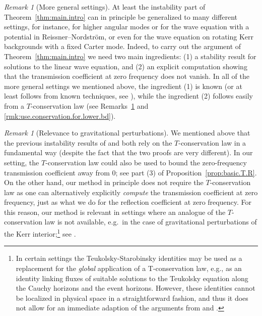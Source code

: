 \documentclass[10pt, reqno]{amsart}
\theoremstyle{definition}
\theoremstyle{remark}
\newtheorem{remark}[theorem]{Remark}
\numberwithin{equation}{section}
\newcommand{\0}{\emptyset}
\begin{document}
\begin{remark}[More general settings]\label{rmk:more.general}
At least the instability part of Theorem~\ref{thm:main.intro} can in principle be generalized to many different settings, for instance, for higher angular modes or for the wave equation with a potential in Reissner--Nordstr\"om, or even for the wave equation on rotating Kerr backgrounds with a fixed Carter mode. Indeed,  to carry out the argument of Theorem~\ref{thm:main.intro} we need two main ingredients: (1) a stability result for solutions to the linear wave equation, and (2) an explicit computation showing that the transmission coefficient at zero frequency does not vanish. In all of the more general settings we mentioned above, the ingredient (1) is known (or at least follows from known techniques, see \cite{Hintz,LS}), while the ingredient (2) follows easily from a $T$-conservation law (see Remarks~\ref{rmk:grav.pert} and \ref{rmk:use.conservation.for.lower.bd}).
\end{remark}

\begin{remark}[Relevance to gravitational perturbations]\label{rmk:grav.pert}
We mentioned above that the previous instability results of \cite{LO.instab} and \cite{LS} both rely on the $T$-conservation law in a fundamental way (despite the fact that the two proofs are very different). In our setting, the $T$-conservation law could also be used to bound the zero-frequency transmission coefficient away from $0$; see part (3) of Proposition~\ref{prop:basic.T.R}. On the other hand, our method in principle does not require the $T$-conservation law as one can alternatively explicitly \emph{compute} the transmission coefficient at zero frequency, just as what we do for the reflection coefficient at zero frequency. For this reason, our method is relevant in settings where an analogue of the $T$-conservation law is not available, e.g.~in the case of gravitational perturbations of the Kerr interior;\footnote{In certain settings the Teukolsky-Starobinsky identities may be used as a replacement for the \emph{global} application of a T-conservation law, e.g., as an identity linking fluxes of suitable solutions to the Teukolsky equation along the Cauchy horizons and the event horizons. However, these identities cannot be localized in physical space in a straightforward fashion, and thus it does not allow for an immediate adaption of the arguments from \cite{LO.instab} and \cite{LS}.}  see \cite{Sbierski.Teukolsky}.
\end{remark}
\end{document}
